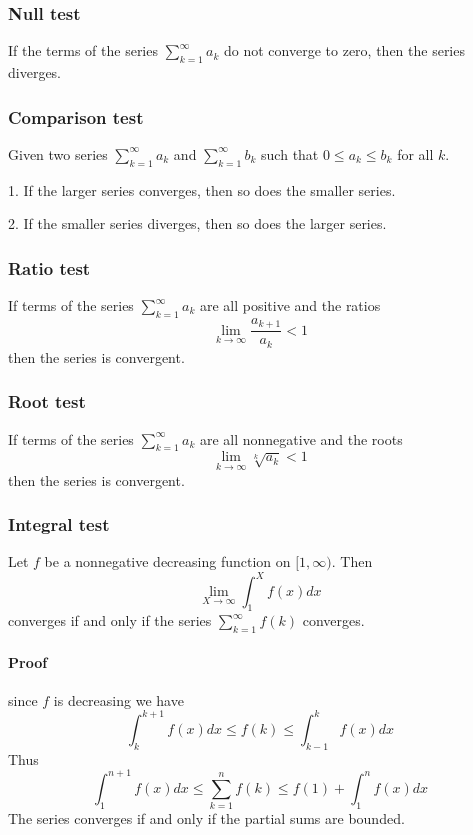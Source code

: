 \documentclass[11pt]{article}
\begin{document}
\subsubsection{Null test}
If the terms of the series $\sum_{k=1}^{\infty} a_{k}$ do not converge to zero, then the series diverges.

\subsubsection{Comparison test}
Given two series $\sum_{k=1}^{\infty} a_{k}$ and $\sum_{k=1}^{\infty} b_{k}$ such that $0 \leq a_{k} \leq b_{k}$ for all $k$.

1. If the larger series converges, then so does the smaller series.

2. If the smaller series diverges, then so does the larger series.

\subsubsection{Ratio test}
If terms of the series $\sum_{k=1}^{\infty} a_{k}$ are all positive and the ratios
$$
\lim _{k \rightarrow \infty} \frac{a_{k+1}}{a_{k}}<1
$$
then the series is convergent.
\subsubsection{Root test}
If terms of the series $\sum_{k=1}^{\infty} a_{k}$ are all nonnegative and the roots
$$
\lim _{k \rightarrow \infty} \sqrt[k]{a_{k}}<1
$$
then the series is convergent.

\subsubsection{Integral test}

Let $f$ be a nonnegative decreasing function on $[1, \infty) .$ Then
$$
\lim _{X \rightarrow \infty} \int_{1}^{X} f(x) d x
$$
converges if and only if the series $\sum_{k=1}^{\infty} f(k)$ converges.

\paragraph{Proof} since $f$ is decreasing we have
$$
\int_{k}^{k+1} f(x) d x \leq f(k) \leq \int_{k-1}^{k} f(x) d x
$$
Thus
$$
\int_{1}^{n+1} f(x) d x \leq \sum_{k=1}^{n} f(k) \leq f(1)+\int_{1}^{n} f(x) d x
$$
The series converges if and only if the partial sums are bounded.
\end{document}
